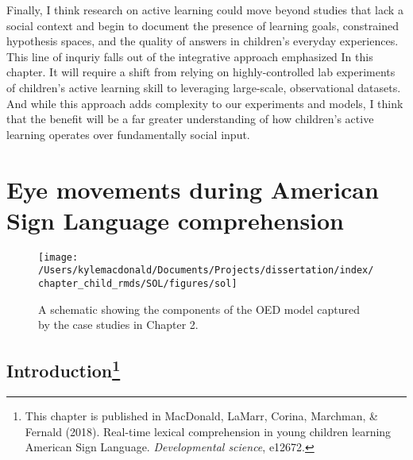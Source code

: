 \documentclass[oneside]{report}
\begin{document}
Finally, I think research on active learning could move beyond studies
that lack a social context and begin to document the presence of
learning goals, constrained hypothesis spaces, and the quality of
answers in children's everyday experiences. This line of inquriy falls
out of the integrative approach emphasized In this chapter. It will
require a shift from relying on highly-controlled lab experiments of
children's active learning skill to leveraging large-scale,
observational datasets. And while this approach adds complexity to our
experiments and models, I think that the benefit will be a far greater
understanding of how children's active learning operates over
fundamentally social input.

\chapter{Eye movements during American Sign Language
comprehension}\label{sol}
\begin{figure}[t]

{\centering \texttt{[image: /Users/kylemacdonald/Documents/Projects/dissertation/index/chapter\_child\_rmds/SOL/figures/sol]} 

}

\caption{A schematic showing the components of the OED model captured by the case studies in Chapter 2.}\label{fig:schematic-sol}
\end{figure}
\section[Introduction]{\texorpdfstring{Introduction\footnote{This
  chapter is published in MacDonald, LaMarr, Corina, Marchman, \&
  Fernald (2018). Real-time lexical comprehension in young children
  learning American Sign Language. \emph{Developmental science}, e12672.}}{Introduction}}\label{introduction-1}
\end{document}
